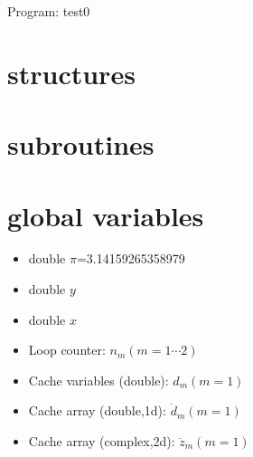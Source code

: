\documentclass[a4paper,fleqn]{ltjsarticle}
\begin{document}
{\Large Program: test0}

\section{structures}
\section{subroutines}
\section{global variables}
\begin{itemize}
\item double $\pi$=3.14159265358979
\item double $y$
\item double $x$
\item Loop counter: \(n_m (m = 1 \cdots 2)\)
\item Cache variables (double): \(d_m (m = 1)\)
\item Cache array (double,1d): \(\dot{d}_m (m = 1)\)
\item Cache array (complex,2d): \(\ddot{z}_m (m = 1)\)
\end{itemize}
\end{document}
